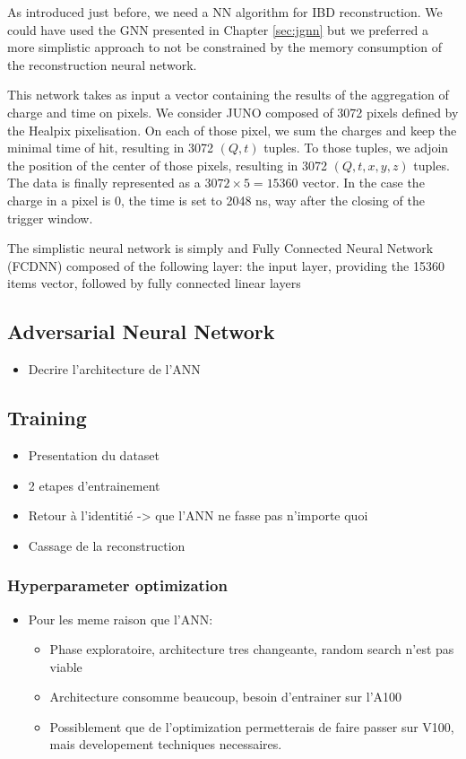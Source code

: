 \documentclass[../main.tex]{subfiles}
\begin{document}
As introduced just before, we need a NN algorithm for IBD reconstruction. We could have used the GNN presented in Chapter \ref{sec:jgnn} but we preferred a more simplistic approach to not be constrained by the memory consumption of the reconstruction neural network.

This network takes as input a vector containing the results of the aggregation of charge and time on pixels. We consider JUNO composed of 3072 pixels defined by the Healpix \cite{gorski_healpix_2005} pixelisation. On each of those pixel, we sum the charges and keep the minimal time of hit, resulting in 3072 $(Q, t)$ tuples. To those tuples, we adjoin the position of the center of those pixels, resulting in 3072 $(Q, t, x, y, z)$ tuples. The data is finally represented as a $3072 \times 5 = 15360$ vector. In the case the charge in a pixel is 0, the time is set to 2048 ns, way after the closing of the trigger window.

The simplistic neural network is simply and Fully Connected Neural Network (FCDNN) composed of the following layer: the input layer, providing the 15360 items vector, followed by fully connected linear layers

\subsection{Adversarial Neural Network}
\label{sec:janne:arch:ann}
\begin{itemize}
  \item Decrire l'architecture de l'ANN
\end{itemize}

\subsection{Training}
\label{sec:janne:arch:training}
\begin{itemize}
  \item Presentation du dataset
  \item 2 etapes d'entrainement
  \item Retour à l'identitié -> que l'ANN ne fasse pas n'importe quoi
  \item Cassage de la reconstruction
\end{itemize}

\subsubsection{Hyperparameter optimization}
\label{sec:janne:arch:hyper}
\begin{itemize}
  \item Pour les meme raison que l'ANN:
    \begin{itemize}
      \item Phase exploratoire, architecture tres changeante, random search n'est pas viable
      \item Architecture consomme beaucoup, besoin d'entrainer sur l'A100
      \item Possiblement que de l'optimization permetterais de faire passer sur V100, mais developement techniques necessaires.
    \end{itemize}
\end{itemize}
\end{document}
